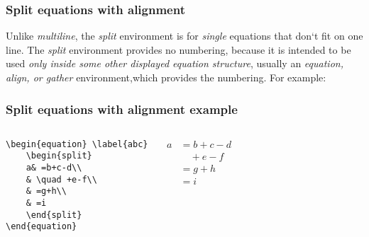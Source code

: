 \documentclass[12pt]{beamer}
\begin{document}
\begin{frame}[fragile]
\frametitle{Split equations with alignment}
Unlike \emph{multiline}, the \emph{split} environment is for \emph{single} equations that don`t fit on one line. The \emph{split} environment provides no numbering, because it is intended to be used \emph{only inside some other displayed equation structure}, usually an \emph{equation, align, or gather} environment,which provides the numbering. For example:\\
\end{frame}
\begin{frame}[fragile]
\frametitle{Split equations with alignment example}
    \begin{columns}
        \begin{block}{}
        \begin{verbatim}
\begin{equation} \label{abc}
    \begin{split}
    a& =b+c-d\\
    & \quad +e-f\\
    & =g+h\\
    & =i
    \end{split}
\end{equation}
        \end{verbatim}
        \end{block}
        \begin{block}{}
        \begin{equation}\label{abc}
          \begin{split}
            a& =b+c-d\\
             & \quad +e-f\\
             & =g+h\\
             & =i
          \end{split}
        \end{equation}
        \end{block}
    \end{columns}

\end{frame}
\end{document}
